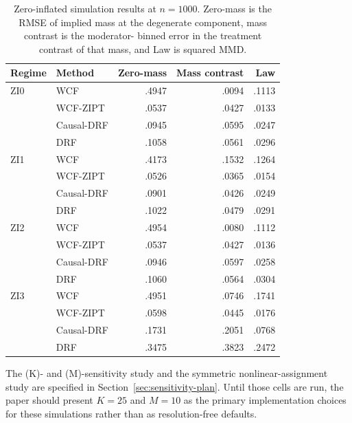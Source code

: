 \begin{table}[t]
\centering\scriptsize
\caption{Zero-inflated simulation results at $n=1000$. Zero-mass is the RMSE
of implied mass at the degenerate component, mass contrast is the moderator-
binned error in the treatment contrast of that mass, and Law is squared MMD.}
\label{tab:revision-zi}
\begin{tabular}{llrrr}
\toprule
Regime & Method & Zero-mass & Mass contrast & Law\\
\midrule
ZI0 & WCF & .4947 & .0094 & .1113\\
    & WCF-ZIPT & .0537 & .0427 & .0133\\
    & Causal-DRF & .0945 & .0595 & .0247\\
    & DRF & .1058 & .0561 & .0296\\
ZI1 & WCF & .4173 & .1532 & .1264\\
    & WCF-ZIPT & .0526 & .0365 & .0154\\
    & Causal-DRF & .0901 & .0426 & .0249\\
    & DRF & .1022 & .0479 & .0291\\
ZI2 & WCF & .4954 & .0080 & .1112\\
    & WCF-ZIPT & .0537 & .0427 & .0136\\
    & Causal-DRF & .0946 & .0597 & .0258\\
    & DRF & .1060 & .0564 & .0304\\
ZI3 & WCF & .4951 & .0746 & .1741\\
    & WCF-ZIPT & .0598 & .0445 & .0176\\
    & Causal-DRF & .1731 & .2051 & .0768\\
    & DRF & .3475 & .3823 & .2472\\
\bottomrule
\end{tabular}
\end{table}

The (K)- and (M)-sensitivity study and the symmetric nonlinear-assignment
study are specified in Section~\ref{sec:sensitivity-plan}. Until those cells
are run, the paper should present $K=25$ and $M=10$ as the primary
implementation choices for these simulations rather than as resolution-free
defaults.

